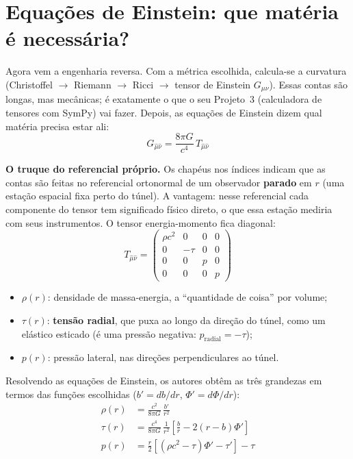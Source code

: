\documentclass[11pt,a4paper]{article}
\begin{document}
\section{Equações de Einstein: que matéria é necessária?}

Agora vem a engenharia reversa. Com a métrica escolhida, calcula-se a curvatura (Christoffel $\to$ Riemann $\to$
Ricci $\to$ tensor de Einstein $G_{\mu\nu}$). Essas contas são longas, mas mecânicas; é exatamente o que o seu
Projeto~3 (calculadora de tensores com SymPy) vai fazer. Depois, as equações de Einstein dizem qual matéria precisa
estar ali:
\begin{equation*}
G_{\hat\mu\hat\nu} = \frac{8\pi G}{c^4}\,T_{\hat\mu\hat\nu}
\end{equation*}

\textbf{O truque do referencial próprio.} Os chapéus nos índices indicam que as contas são feitas no referencial
ortonormal de um observador \textbf{parado} em $r$ (uma estação espacial fixa perto do túnel). A vantagem: nesse
referencial cada componente do tensor tem significado físico direto, o que essa estação mediria com seus
instrumentos. O tensor energia-momento fica diagonal:
\begin{equation*}
T_{\hat\mu\hat\nu} = \begin{pmatrix} \rho c^2 & 0 & 0 & 0 \\ 0 & -\tau & 0 & 0 \\ 0 & 0 & p & 0 \\ 0 & 0 & 0 & p \end{pmatrix}
\end{equation*}
\begin{itemize}[nosep]
\item $\rho(r)$: densidade de massa-energia, a ``quantidade de coisa'' por volume;
\item $\tau(r)$: \textbf{tensão radial}, que puxa ao longo da direção do túnel, como um elástico esticado (é uma
pressão negativa: $p_{\text{radial}} = -\tau$);
\item $p(r)$: pressão lateral, nas direções perpendiculares ao túnel.
\end{itemize}

Resolvendo as equações de Einstein, os autores obtêm as três grandezas em termos das funções escolhidas
($b' = db/dr$, $\Phi' = d\Phi/dr$):
\begin{align}
\rho(r) &= \frac{c^2}{8\pi G}\,\frac{b'}{r^2} \label{eq:rho}\\[0.3em]
\tau(r) &= \frac{c^4}{8\pi G}\,\frac{1}{r^2}\left[\frac{b}{r} - 2\left(r - b\right)\Phi'\right] \label{eq:tau}\\[0.3em]
p(r) &= \frac{r}{2}\left[\left(\rho c^2 - \tau\right)\Phi' - \tau'\right] - \tau \label{eq:p}
\end{align}
\end{document}
